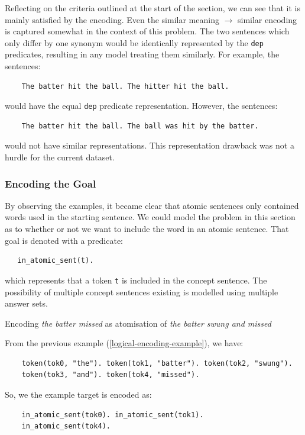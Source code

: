 Reflecting on the criteria outlined at the start of the section, we can see that it is mainly satisfied by the encoding. 
Even the similar meaning $\rightarrow$ similar encoding is captured somewhat in the context of this problem.
The two sentences which only differ by one synonym would be identically represented by the \verb_dep_ predicates, resulting in any model treating them similarly.
For example, the sentences:
\begin{verbatim}
    The batter hit the ball. The hitter hit the ball.
\end{verbatim}
would have the equal \verb_dep_ predicate representation. 
However, the sentences:
\begin{verbatim}
    The batter hit the ball. The ball was hit by the batter.
\end{verbatim}
would not have similar representations.
This representation drawback was not a hurdle for the current dataset.

\subsubsection{Encoding the Goal}
\label{encoding-the-example-target}

By observing the examples, it became clear that atomic sentences only contained words used in the starting sentence.
We could model the problem in this section as to whether or not we want to include the word in an atomic sentence.
That goal is denoted with a predicate:
\begin{verbatim}
   in_atomic_sent(t).
\end{verbatim}
which represents that a token \verb+t+ is included in the concept sentence.
The possibility of multiple concept sentences existing is modelled using multiple answer sets.
\begin{example}
\label{example-encoding-target}
Encoding \textit{the batter missed} as atomisation of \textit{the batter swung and missed}

From the previous example (\ref{logical-encoding-example}), we have:
\begin{verbatim}
    token(tok0, "the"). token(tok1, "batter"). token(tok2, "swung").
    token(tok3, "and"). token(tok4, "missed").
\end{verbatim}
So, we the example target is encoded as:
\begin{verbatim}
    in_atomic_sent(tok0). in_atomic_sent(tok1).
    in_atomic_sent(tok4).
\end{verbatim}

\end{example}


